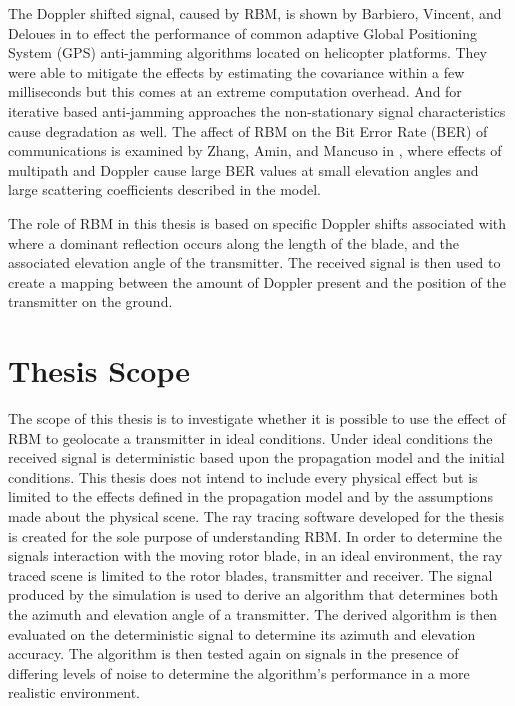 The Doppler shifted signal, caused by RBM, is shown by Barbiero, Vincent, and Deloues in \cite{F.BarbieroF.VincentT.Deloues2014} to effect the performance of common adaptive Global Positioning System (GPS) anti-jamming algorithms located on helicopter platforms. They were able to mitigate the effects by estimating the covariance within a few milliseconds but this comes at an extreme computation overhead. And for iterative based anti-jamming approaches the non-stationary signal characteristics cause degradation as well. The affect of RBM on the Bit Error Rate (BER) of communications is examined by Zhang, Amin, and Mancuso in \cite{YiminZhang2000}, where effects of multipath and Doppler cause large BER values at small elevation angles and large scattering coefficients described in the model.

The role of RBM in this thesis is based on specific Doppler shifts associated with where a dominant reflection occurs along the length of the blade, and the associated elevation angle of the transmitter. The received signal is then used to create a mapping between the amount of Doppler present and the position of the transmitter on the ground.

\section{Thesis Scope}

The scope of this thesis is to investigate whether it is possible to use the effect of RBM to geolocate a transmitter in ideal conditions. Under ideal conditions the received signal is deterministic based upon the propagation model and the initial conditions. This thesis does not intend to include every physical effect but is limited to the effects defined in the propagation model and by the assumptions made about the physical scene. The ray tracing software developed for the thesis is created for the sole purpose of understanding RBM. In order to determine the signals interaction with the moving rotor blade, in an ideal environment, the ray traced scene is limited to the rotor blades, transmitter and receiver. The signal produced by the simulation is used to derive an algorithm that determines both the azimuth and elevation angle of a transmitter. The derived algorithm is then evaluated on the deterministic signal to determine its azimuth and elevation accuracy. The algorithm is then tested again on signals in the presence of differing levels of noise to determine the algorithm's performance in a more realistic environment.

